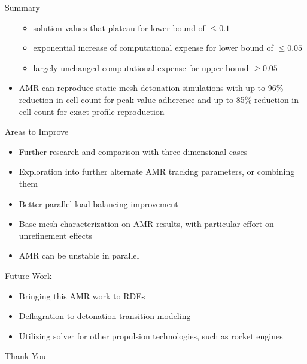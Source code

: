\begin{frame}[allowframebreaks]{Summary}
\begin{itemize}
\begin{itemize}
    \item solution values that plateau for lower bound of $\leq 0.1$
    \item exponential increase of computational expense for lower bound of $\leq 0.05$
    \item largely unchanged computational expense for upper bound $\geq 0.05$
\end{itemize}
\item AMR can reproduce static mesh detonation simulations with up to 96\% reduction in cell count for peak value adherence and up to 85\% reduction in cell count for exact profile reproduction 
\end{itemize}
\end{frame}


\begin{frame}{Areas to Improve}
\begin{itemize}
\item Further research and comparison with three-dimensional cases 
\item Exploration into further alternate AMR tracking parameters, or combining them 
\item Better parallel load balancing improvement 
\item Base mesh characterization on AMR results, with particular effort on unrefinement effects
\item AMR can be unstable in parallel 
\end{itemize}
\end{frame}

\begin{frame}{Future Work}
\begin{itemize}
\item Bringing this AMR work to RDEs
\item Deflagration to detonation transition modeling
\item Utilizing solver for other propulsion technologies, such as rocket engines
\end{itemize}
\end{frame}

\begin{frame}
\begin{center}
{\Huge Thank You}    
\end{center}
\end{frame}